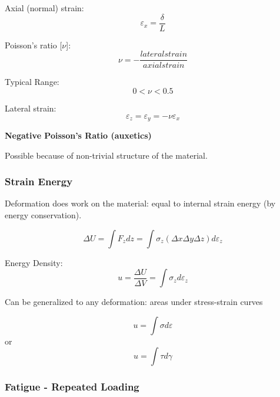 \noindent Axial (normal) strain: \[\varepsilon_{x} = \frac{\delta}{L}\]

\noindent Poisson's ratio [$\nu$]: \[\nu = -\frac{lateral strain}{axial strain}\]

\noindent Typical Range: \[0 < \nu < 0.5\] 

\noindent Lateral strain: \[\varepsilon_{z} = \varepsilon_{y} = -\nu\varepsilon_{x}\]

\noindent \textbf{Negative Poisson's Ratio (auxetics)}

\vspace{5pt}

\noindent Possible because of non-trivial structure of the material.

\subsubsection{Strain Energy }

\vspace{5pt}

\noindent \textbf{}

\noindent Deformation does work on the material: equal to internal strain energy (by energy conservation).

\[\Delta U = \int F_{z}dz = \int \sigma_{z}(\Delta x \Delta y \Delta z)d\varepsilon_{z}\]

\noindent Energy Density: \[u = \frac{\Delta U}{\Delta V} = \int \sigma_{z}d\varepsilon_{z}\]

\noindent Can be generalized to any deformation: areas under stress-strain curves

\[u = \int \sigma d\varepsilon\] or \[u = \int \tau d\gamma\]


\subsubsection{Fatigue - Repeated Loading }

